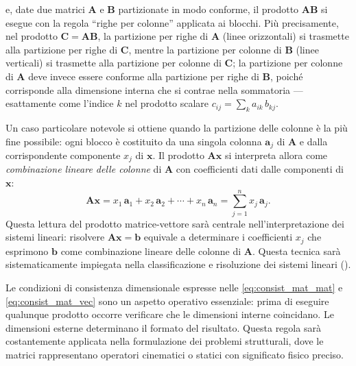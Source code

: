 e, date due matrici $\bm{A}$ e $\bm{B}$ partizionate in modo conforme,
il prodotto $\bm{A}\bm{B}$ si esegue con la regola ``righe per colonne''
applicata ai blocchi. Pi\`u precisamente, nel prodotto
$\bm{C}=\bm{A}\bm{B}$, la partizione per righe di $\bm{A}$ (linee
orizzontali) si trasmette alla partizione per righe di $\bm{C}$, mentre
la partizione per colonne di $\bm{B}$ (linee verticali) si trasmette
alla partizione per colonne di $\bm{C}$; la partizione per colonne di
$\bm{A}$ deve invece essere conforme alla partizione per righe di
$\bm{B}$, poich\'e corrisponde alla dimensione interna che si contrae
nella sommatoria --- esattamente come l'indice $k$ nel prodotto scalare
$c_{ij}=\sum_k a_{ik}\,b_{kj}$.

Un caso particolare notevole si ottiene quando la partizione delle colonne
\`e la pi\`u fine possibile: ogni blocco \`e costituito da una singola colonna
$\bm{a}_j$ di $\bm{A}$ e dalla corrispondente componente $x_j$ di $\bm{x}$.
Il prodotto $\bm{A}\bm{x}$ si interpreta allora come \textit{combinazione
	lineare delle colonne} di $\bm{A}$ con coefficienti dati dalle componenti
di $\bm{x}$:
\begin{equation}\label{eq:comb_lin_colonne}
	\bm{A}\bm{x} = x_1\,\bm{a}_1 + x_2\,\bm{a}_2 + \cdots + x_n\,\bm{a}_n
	= \sum_{j=1}^{n} x_j\,\bm{a}_j.
\end{equation}
Questa lettura del prodotto matrice-vettore sar\`a centrale nell'interpretazione
dei sistemi lineari: risolvere $\bm{A}\bm{x}=\bm{b}$ equivale a determinare
i coefficienti $x_j$ che esprimono $\bm{b}$ come combinazione lineare delle
colonne di $\bm{A}$. Questa tecnica sar\`a sistematicamente impiegata nella classificazione e risoluzione dei sistemi lineari ().



\begin{oss}
	Le condizioni di consistenza dimensionale espresse nelle  \eqref{eq:consist_mat_mat} e \eqref{eq:consist_mat_vec} sono un aspetto operativo essenziale: prima di eseguire qualunque prodotto occorre verificare che le dimensioni interne coincidano. Le dimensioni esterne determinano il formato del risultato. Questa regola sar\`a costantemente applicata nella formulazione dei problemi strutturali, dove le matrici rappresentano operatori cinematici o statici con significato fisico preciso.
\end{oss}

